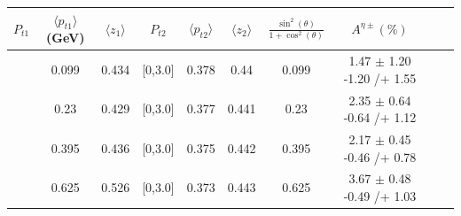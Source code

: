 \begin{table}[H]\scriptsize
\centering
\begin{tabular}{|c| c| c| c| c| c| c| c| c| c|}
\hline
$P_{t1}$   & $\langle  p_{t1} \rangle$(GeV) & $\langle  z_1 \rangle$& $P_{t2}$  & $\langle  p_{t2}\rangle$  &  $\langle  z_2 \rangle$  &$\frac{\sin^2(\theta)}{1+\cos^2(\theta)}$&  $A^{\eta\pm}(\%)$  \\ \hline
[0,0.15]	&	0.099	&	0.434	&	[0,3.0]	&	0.378	&	0.44	        &	0.099	&	1.47	$\pm$ 	1.20	-1.20	/+	1.55	\\ \hline
[0.15,0.3]	&	0.23	        &	0.429	&	[0,3.0]	&	0.377	&	0.441	&	0.23	        &	2.35	$\pm$ 	0.64	-0.64	/+	1.12	\\ \hline
[0.3,0.5]	&	0.395	&	0.436	&	[0,3.0]	&	0.375	&	0.442	&	0.395	&	2.17	$\pm$ 	0.45	-0.46	/+	0.78	\\ \hline
[0.5,3.0]	&	0.625	&	0.526	&	[0,3.0]	&	0.373	&	0.443	&	0.625	&	3.67	$\pm$ 	0.48	-0.49	/+	1.03	\\ \hline
														

\end{tabular}
\end{table}
